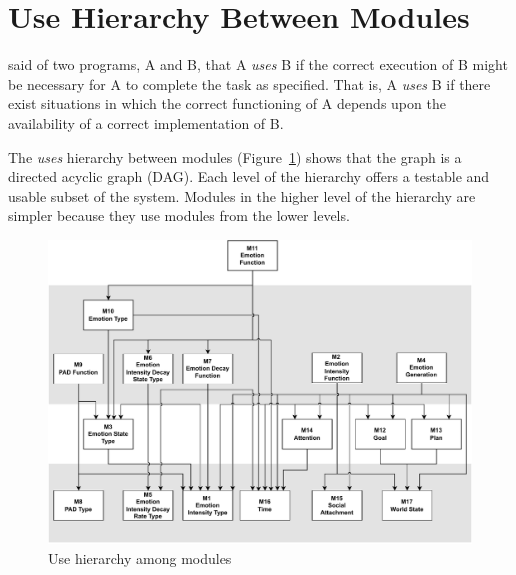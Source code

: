 \section{Use Hierarchy Between Modules}\label{SecUse}

\citet{Parnas1978} said of two programs, A and B, that A {\em uses} B if the
correct execution of B might be necessary for A to complete the task as
specified. That is, A {\em uses} B if there exist situations in which the
correct functioning of A depends upon the availability of a correct
implementation of B.

The \textit{uses} hierarchy between modules (Figure~\ref{FigUH}) shows that the
graph is a directed acyclic graph (DAG). Each level of the hierarchy offers a
testable and usable subset of the system. Modules in the higher level of the
hierarchy are simpler because they use modules from the lower levels.

\vspace*{\fill}
\begin{figure}[!tbh]
    \centering
    \includegraphics[width=\linewidth]{figures/usesHierarchy.pdf}
    \caption{Use hierarchy among modules}
    \label{FigUH}
\end{figure}
\vspace*{\fill}